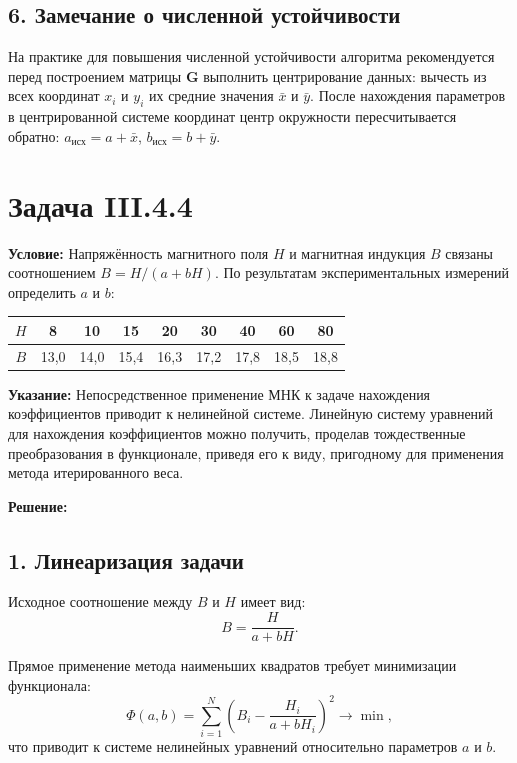 \documentclass{article}
\begin{document}
\subsection*{6. Замечание о численной устойчивости}

На практике для повышения численной устойчивости алгоритма рекомендуется перед построением матрицы $\mathbf{G}$ выполнить центрирование данных: вычесть из всех координат $x_i$ и $y_i$ их средние значения $\bar{x}$ и $\bar{y}$. После нахождения параметров в центрированной системе координат центр окружности пересчитывается обратно: $a_{\text{исх}} = a + \bar{x}$, $b_{\text{исх}} = b + \bar{y}$.

\newpage
\section*{Задача III.4.4}

\textbf{Условие:} Напряжённость магнитного поля $H$ и магнитная индукция $B$ связаны соотношением $B = H/(a + bH)$. По результатам экспериментальных измерений определить $a$ и $b$:

\begin{center}
\begin{tabular}{|c|c|c|c|c|c|c|c|c|}
\hline
$H$ & 8 & 10 & 15 & 20 & 30 & 40 & 60 & 80 \\
\hline
$B$ & 13,0 & 14,0 & 15,4 & 16,3 & 17,2 & 17,8 & 18,5 & 18,8 \\
\hline
\end{tabular}
\end{center}

\textbf{Указание:} Непосредственное применение МНК к задаче нахождения коэффициентов приводит к нелинейной системе. Линейную систему уравнений для нахождения коэффициентов можно получить, проделав тождественные преобразования в функционале, приведя его к виду, пригодному для применения метода итерированного веса.

\vspace{0.5cm}
\textbf{Решение:}

\subsection*{1. Линеаризация задачи}

Исходное соотношение между $B$ и $H$ имеет вид:
\begin{equation}
B = \frac{H}{a + bH}.
\label{eq:44_orig}
\end{equation}

Прямое применение метода наименьших квадратов требует минимизации функционала:
\begin{equation}
\Phi(a, b) = \sum_{i=1}^{N} \left(B_i - \frac{H_i}{a + bH_i}\right)^2 \to \min,
\end{equation}
что приводит к системе нелинейных уравнений относительно параметров $a$ и $b$.
\end{document}
